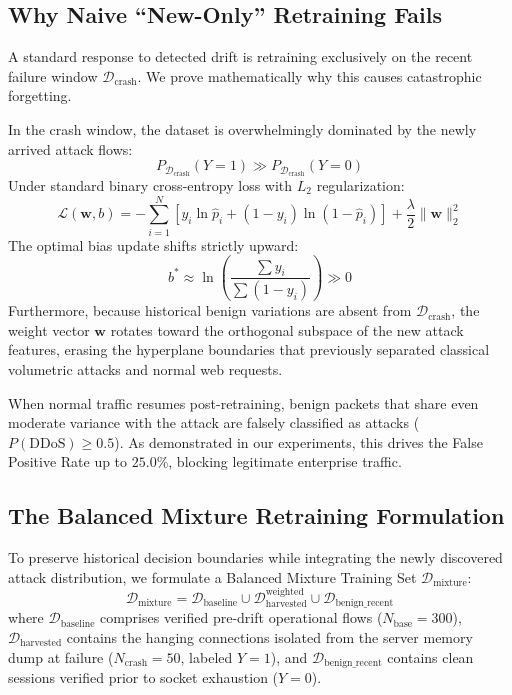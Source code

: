 \documentclass[conference]{IEEEtran}
\begin{document}
\subsection{Why Naive ``New-Only'' Retraining Fails}
A standard response to detected drift is retraining exclusively on the recent failure window $\mathcal{D}_{\text{crash}}$. We prove mathematically why this causes catastrophic forgetting.

In the crash window, the dataset is overwhelmingly dominated by the newly arrived attack flows:
\begin{equation}
P_{\mathcal{D}_{\text{crash}}}(Y = 1) \gg P_{\mathcal{D}_{\text{crash}}}(Y = 0)
\end{equation}
Under standard binary cross-entropy loss with $L_2$ regularization:
\begin{equation}
\mathcal{L}(\mathbf{w}, b) = -\sum_{i=1}^N \left[ y_i \ln \hat{p}_i + (1 - y_i) \ln(1 - \hat{p}_i) \right] + \frac{\lambda}{2} \|\mathbf{w}\|_2^2
\end{equation}
The optimal bias update shifts strictly upward:
\begin{equation}
b^* \approx \ln\left(\frac{\sum y_i}{\sum (1 - y_i)}\right) \gg 0
\end{equation}
Furthermore, because historical benign variations are absent from $\mathcal{D}_{\text{crash}}$, the weight vector $\mathbf{w}$ rotates toward the orthogonal subspace of the new attack features, erasing the hyperplane boundaries that previously separated classical volumetric attacks and normal web requests. 

When normal traffic resumes post-retraining, benign packets that share even moderate variance with the attack are falsely classified as attacks ($P(\text{DDoS}) \ge 0.5$). As demonstrated in our experiments, this drives the False Positive Rate up to $25.0\%$, blocking legitimate enterprise traffic.

\subsection{The Balanced Mixture Retraining Formulation}
To preserve historical decision boundaries while integrating the newly discovered attack distribution, we formulate a Balanced Mixture Training Set $\mathcal{D}_{\text{mixture}}$:
\begin{equation}
\mathcal{D}_{\text{mixture}} = \mathcal{D}_{\text{baseline}} \cup \mathcal{D}_{\text{harvested}}^{\text{weighted}} \cup \mathcal{D}_{\text{benign\_recent}}
\end{equation}
where $\mathcal{D}_{\text{baseline}}$ comprises verified pre-drift operational flows ($N_{\text{base}} = 300$), $\mathcal{D}_{\text{harvested}}$ contains the hanging connections isolated from the server memory dump at failure ($N_{\text{crash}} = 50$, labeled $Y=1$), and $\mathcal{D}_{\text{benign\_recent}}$ contains clean sessions verified prior to socket exhaustion ($Y=0$).
\end{document}
